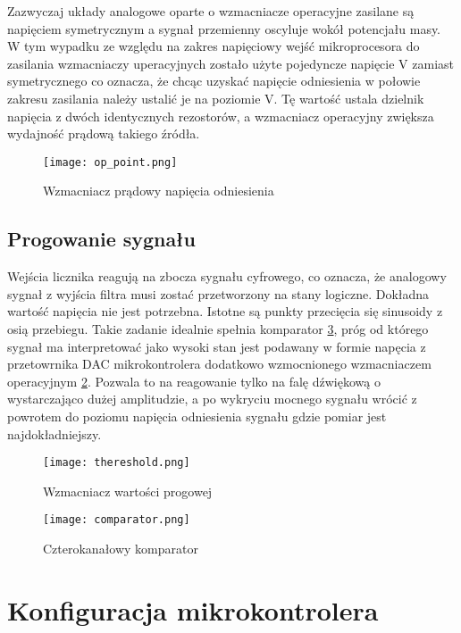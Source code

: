 
Zazwyczaj układy analogowe oparte o wzmacniacze operacyjne zasilane są napięciem symetrycznym a sygnał przemienny oscyluje wokół potencjału masy. 
W tym wypadku ze względu na zakres napięciowy wejść mikroprocesora do zasilania wzmacniaczy uperacyjnych 
zostało użyte pojedyncze napięcie \unit[3,3]{V} zamiast symetrycznego co oznacza, 
że chcąc uzyskać napięcie odniesienia w połowie zakresu zasilania należy ustalić je na poziomie \unit[1,65]{V}. 
Tę wartość ustala dzielnik napięcia z dwóch identycznych rezostorów,
a wzmacniacz operacyjny zwiększa wydajność prądową takiego źródła. 
\begin{figure}[ht!]
    \centering
    \texttt{[image: op\_point.png]}
    \caption{Wzmacniacz prądowy napięcia odniesienia}
    \label{fig:op_point}
\end{figure}

\subsection{Progowanie sygnału}
Wejścia licznika reagują na zbocza sygnału cyfrowego, co oznacza, że analogowy sygnał z wyjścia filtra musi zostać przetworzony na stany logiczne.
Dokładna wartość napięcia nie jest potrzebna. Istotne są punkty przecięcia się sinusoidy z osią przebiegu.
Takie zadanie idealnie spełnia komparator \ref*{fig:comparator}, próg od którego sygnał ma interpretować jako wysoki stan jest podawany w formie 
napęcia z przetowrnika DAC mikrokontrolera dodatkowo wzmocnionego wzmacniaczem operacyjnym \ref*{fig:thereshold}.
Pozwala to na reagowanie tylko na falę dźwiękową o wystarczająco dużej amplitudzie, 
a po wykryciu mocnego sygnału wrócić z powrotem do poziomu napięcia odniesienia sygnału gdzie pomiar jest najdokładniejszy.

\begin{figure}[ht!]
    \centering
    \texttt{[image: thereshold.png]}
    \caption{Wzmacniacz wartości progowej}
    \label{fig:thereshold}
\end{figure}

\begin{figure}[ht!]
    \centering
    \texttt{[image: comparator.png]}
    \caption{Czterokanałowy komparator}
    \label{fig:comparator}
\end{figure}

\section{Konfiguracja mikrokontrolera}

